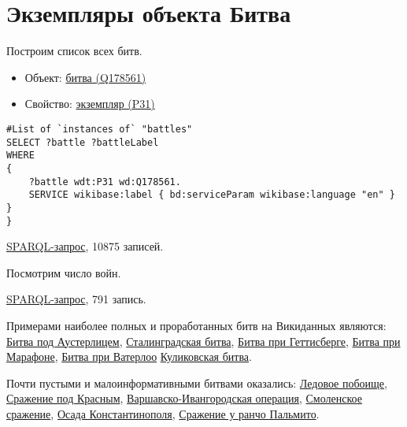\section{Экземпляры объекта Битва}
\begin{itemize}

Построим список всех битв.
\end{itemize}

\begin{itemize}
    \item Объект: \href{https://www.wikidata.org/wiki/Q178561}{битва (Q178561)}
    \item Свойство: \href{https://www.wikidata.org/wiki/Property:P31}{экземпляр (P31)}
\end{itemize}

\begin{lstlisting}[language=SPARQL  ]
#List of `instances of` "battles" 
SELECT ?battle ?battleLabel
WHERE
{
    ?battle wdt:P31 wd:Q178561.
    SERVICE wikibase:label { bd:serviceParam wikibase:language "en" }
}
}

\end{lstlisting}

\href{https://query.wikidata.org/#%23added%202017-02%0A%23List%20of%20%60instances%20of%60%20%22national%20park%22%20%0ASELECT%20%3Fbattle%20%3FbattleLabel%0AWHERE%0A%7B%0A%20%20%20%20%3Fbattle%20wdt%3AP31%20wd%3AQ178561.%0A%20%20%20%20SERVICE%20wikibase%3Alabel%20%7B%20bd%3AserviceParam%20wikibase%3Alanguage%20%22en%22%20%7D%0A%7D}{SPARQL-запрос}, 10875 записей.

Посмотрим число войн.

\href{https://query.wikidata.org/#%23List%20of%20%60instances%20of%60%20%22war%22%20%0ASELECT%20%3Fwar%20%3FwarLabel%20WHERE%20%7B%0A%20%20%3Fwar%20wdt%3AP31%20wd%3AQ198.%0A%20%20SERVICE%20wikibase%3Alabel%20%7B%20bd%3AserviceParam%20wikibase%3Alanguage%20%22ru%22.%20%7D%0A%7D SPARQL-запрос}{SPARQL-запрос}, 791 запись.


Примерами наиболее полных и проработанных битв на Викиданных являются:
\href{https://www.wikidata.org/wiki/Q134114}{Битва под Аустерлицем}, 
\href{https://www.wikidata.org/wiki/Q38789}{Сталинградская битва},
\href{https://www.wikidata.org/wiki/Q33132}{Битва при Геттисберге},
\href{https://www.wikidata.org/wiki/Q31900}{Битва при Марафоне},
\href{https://www.wikidata.org/wiki/Q48314}{Битва при Ватерлоо}
\href{https://www.wikidata.org/wiki/Q210354}{Куликовская битва}.

Почти пустыми и малоинформативными битвами оказались:
\href{https://www.wikidata.org/wiki/Q14689}{Ледовое побоище},
\href{https://www.wikidata.org/wiki/Q25809}{Сражение под Красным},
\href{https://www.wikidata.org/wiki/Q28205}{Варшавско-Ивангородская операция},
\href{https://www.wikidata.org/wiki/Q1071578}{Смоленское сражение},
\href{https://www.wikidata.org/wiki/Q27900}{Осада Константинополя},
\href{https://www.wikidata.org/wiki/Q48776}{Сражение у ранчо Пальмито}.